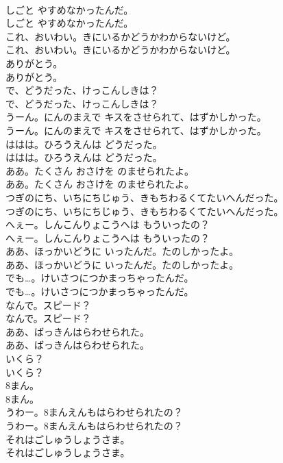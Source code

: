 \documentclass[8pt]{extreport}
\begin{document}
\begin{CJK}{UTF8}{min}
\\	しごと やすめなかったんだ。	
\\	しごと やすめなかったんだ。 
\\	これ、おいわい。きにいるかどうかわからないけど。	
\\	これ、おいわい。きにいるかどうかわからないけど。 
\\	ありがとう。	
\\	ありがとう。 
\\	で、どうだった、けっこんしきは？	
\\	で、どうだった、けっこんしきは？ 
\\	うーん。にんのまえで キスをさせられて、はずかしかった。	
\\	うーん。にんのまえで キスをさせられて、はずかしかった。 
\\	ははは。ひろうえんは どうだった。	
\\	ははは。ひろうえんは どうだった。 
\\	ああ。たくさん おさけを のませられたよ。	
\\	ああ。たくさん おさけを のませられたよ。 
\\	つぎのにち、いちにちじゅう、きもちわるくてたいへんだった。	
\\	つぎのにち、いちにちじゅう、きもちわるくてたいへんだった。 
\\	へぇー。しんこんりょこうへは もういったの？	
\\	へぇー。しんこんりょこうへは もういったの？ 
\\	ああ、ほっかいどうに いったんだ。たのしかったよ。	
\\	ああ、ほっかいどうに いったんだ。たのしかったよ。 
\\	でも…。けいさつにつかまっちゃったんだ。	
\\	でも…。けいさつにつかまっちゃったんだ。 
\\	なんで。スピード？	
\\	なんで。スピード？ 
\\	ああ、ばっきんはらわせられた。	
\\	ああ、ばっきんはらわせられた。 
\\	いくら？	
\\	いくら？ 
\\	8まん。	
\\	8まん。 
\\	うわー。8まんえんもはらわせられたの？	
\\	うわー。8まんえんもはらわせられたの？ 
\\	それはごしゅうしょうさま。	
\\	それはごしゅうしょうさま。 

\end{CJK}
\end{document}
